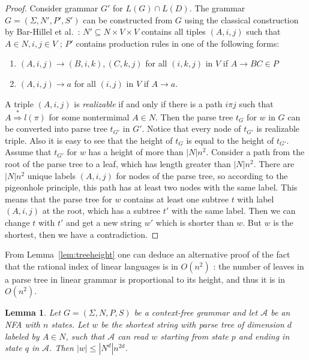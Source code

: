 \documentclass[11pt,a4paper]{article} %
\newtheorem{lemma}{Lemma}
\begin{document}
\begin{proof}
Consider grammar $G'$ for $L(G)\cap L(D)$. The grammar $G = (\Sigma, N', P', S')$ can be constructed from $G$ using the classical construction by Bar-Hillel et al.~\cite{BarHillel}: $N' \subseteq N \times V \times V $  contains all tiples $(A, i, j)$ such that $A \in N, i, j \in V$ ; $P'$ contains production rules in one of the following forms:
\begin{enumerate}
\item $(A, i, j) \rightarrow (B, i, k), (C, k, j)$ for all $(i, k, j)$ in $V$  if $A \rightarrow BC \in P$
\item $(A, i, j) \rightarrow a$ for all $(i, j)$ in $V$ if $A \rightarrow a$.
\end{enumerate}
A triple $(A, i, j)$ is \textit{realizable} if and only if there is a path $i\pi j$ such that $A \stackrel {*}{\Rightarrow } l(\pi)$ for some nontermimal $A \in N$. Then the parse tree $t_G$ for $w$ in $G$ can be converted into parse tree $t_{G'}$ in $G'$. Notice that every node of $t_{G'}$ is realizable triple. Also it is easy to see that the height of $t_G$ is equal to the height of $t_{G'}$. Assume that $t_{G'}$ for $w$ has a height of more than $|N|n^2$. Consider a path from the root of the parse tree to a leaf, which has length greater than $|N|n^2$. There are $|N|n^2$ unique labels $(A, i, j)$ for nodes of the parse tree, so according to the pigeonhole principle, this path has at least two nodes with the same label. This means that the parse tree for $w$ contains at least one subtree $t$ with label $(A, i, j)$ at the root, which has a subtree $t'$ with the same label. Then we can change $t$ with $t'$ and get a new string $w'$ which is shorter than $w$. But $w$ is the shortest, then we have a contradiction.
\end{proof}
From Lemma~\ref{lem:treeheight} one can deduce an alternative proof of the fact that the rational index of linear languages is in $O(n^2)$ \cite{RatBasic}: the number of leaves in a parse tree in linear grammar is proportional to its height, and thus it is in $O(n^2)$.
\begin{lemma}
\label{dimlemma}
Let $G = (\Sigma, N, P, S)$ be a context-free grammar and let $\mathcal{A}$ be an NFA with $n$ states. Let $w$ be the shortest string with parse tree of dimension $d$ labeled by $A \in N$, such that $\mathcal{A}$ can read $w$ starting from state $p$ and ending in state $q$ in $\mathcal{A}$. Then $|w| \leq |N^d|n^{2d}$.
\end{lemma}
\end{document}
